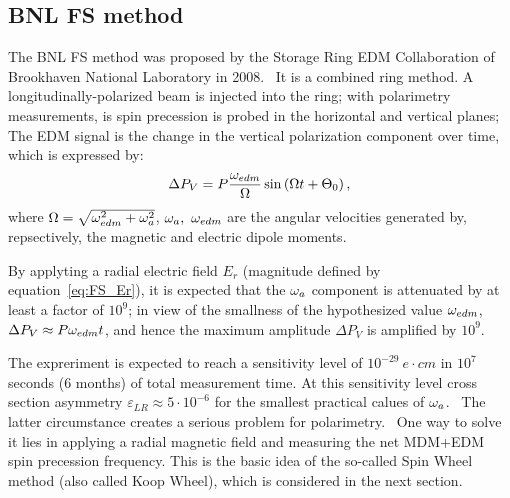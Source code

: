 \newcommand{\wimp}{\w_{\avg{E_v}}}
\newcommand{\wsw}{\w_{SW}}
\newcommand{\wedm}{\w_{edm}}

\newcommand{\D}{\Delta}

\subsection{BNL FS method}
The BNL FS method was proposed by the Storage Ring EDM Collaboration
of Brookhaven National Laboratory in 2008.~\cite{BNL:Deuteron2008}
It is a combined ring method. A longitudinally-polarized beam is
injected into the ring; with polarimetry measurements,
is spin precession is probed in the horizontal and vertical planes;
The EDM signal is the change in the vertical polarization component over time,
which is expressed by:~\cite[p.~8]{BNL:Deuteron2008}
\begin{equation}
  \Delta P_V = P\frac{\w_{edm}}{\W}\sin\bkt{\W t + \Theta_0},
\end{equation}
where $\Omega = \sqrt{\omega_{edm}^2 + \omega_a^2}$, $\omega_a,~\omega_{edm}$ are the angular velocities
generated by, repsectively, the magnetic and electric dipole moments.

By applyting a radial electric field $E_r$ (magnitude defined by equation~\eqref{eq:FS_Er}),
it is expected that the $\omega_a$ component is attenuated by at least a factor of $10^9$; in view
of the smallness of the hypothesized value $\omega_{edm}$, $\Delta P_V \approx P \omega_{edm} t$,
and hence the maximum amplitude $\Delta P_V$ is amplified by $10^9$.

The expreriment is expected to reach a sensitivity level of $10^{-29}~e\cdot cm$ in $10^7$
seconds (6 months) of total measurement time. At this sensitivity level
cross section asymmetry $\varepsilon_{LR} \approx 5\cdot 10^{-6}$ for the smallest practical
calues of $\omega_a$.~\cite[p.~18]{BNL:Deuteron2008} The latter circumstance creates a
serious problem for polarimetry.~\cite{Mane:SpinWheel} One way to solve it lies in applying
a radial magnetic field and measuring the net MDM+EDM spin precession frequency.
This is the basic idea of the so-called Spin Wheel method (also called Koop Wheel),
which is considered in the next section.

